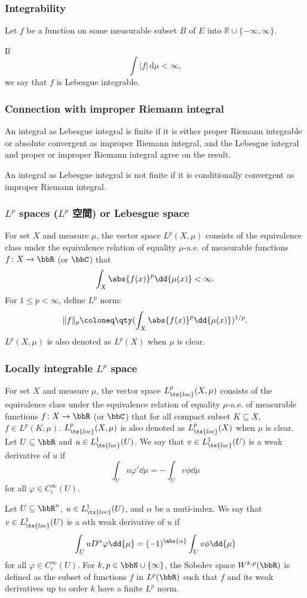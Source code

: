 \subsubsection{Integrability}
Let $f$ be a function on some measurable subset $B$ of $E$ into $\mathbb{R}\cup\{-\infty,\infty\}$.

If
\[\int |f|\,\mathrm {d} \mu <\infty ,\]
we say that $f$ is Lebesgue integrable.
\subsubsection{Connection with improper Riemann integral}
An integral as Lebesgue integral is finite if it is either proper Riemann integrable or absolute convergent as improper Riemann integral, and the Lebesgue integral and proper or improper Riemann integral agree on the result.

An integral as Lebesgue integral is not finite if it is conditionally convergent as improper Riemann integral.
\subsubsection{$L^p$ spaces ($L^p$ 空間) or Lebesgue space}
For set $X$ and measure $\mu$, the vector space $L^p(X,\mu)$ consists of the equivalence class under the equivalence relation of equality $\mu$-a.e. of measurable functions $f\colon X\to\bbR$ (or $\bbC$) that
\[\int_X\abs{f(x)}^p\dd{\mu(x)}<\infty.\]
For $1\leq p<\infty$, define $L^p$ norm:
\[\|f\|_p\coloneq\qty(\int_X\abs{f(x)}^p\dd{\mu(x)})^{1/p}.\]
$L^p(X,\mu)$ is also denoted as $L^p(X)$ when $\mu$ is clear.
\subsubsection{Locally integrable $L^p$ space}
For set $X$ and measure $\mu$, the vector space $L^p_{\tx{loc}}(X,\mu)$ consists of the equivalence class under the equivalence relation of equality $\mu$-a.e. of measurable functions $f\colon X\to\bbR$ (or $\bbC$) that for all compact subset $K\subseteq X$, $f\in L^p(K,\mu)$. $L^p_{\tx{loc}}(X,\mu)$ is also denoted as $L^p_{\tx{loc}}(X)$ when $\mu$ is clear.
Let $U\subseteq\bbR$ and $u\in L^1_{\tx{loc}}(U)$. We say that $v\in L^1_{\tx{loc}}(U)$ is a weak derivative of $u$ if
\[\int_Uu\varphi'\dd{\mu}=-\int_Uv\phi\dd{\mu}\]
for all $\varphi\in C^{\infty}_c(U)$.

Let $U\subseteq\bbR^n$, $u\in L^1_{\tx{loc}}(U)$, and $\alpha$ be a muti-index. We say that $v\in L^1_{\tx{loc}}(U)$ is a $\alpha$th weak derivative of $u$ if
\[\int_UuD^{\alpha}\varphi\dd{\mu}=(-1)^{\abs{\alpha}}\int_Uv\phi\dd{\mu}\]
for all $\varphi\in C^{\infty}_c(U)$.
For $k,p\in\bbN\cup\{\infty\}$, the Sobolev space $W^{k,p}(\bbR)$ is defined as the subset of functions $f$ in $L^p(\bbR)$ such that $f$ and its weak derivatives up to order $k$ have a finite $L^p$ norm.

